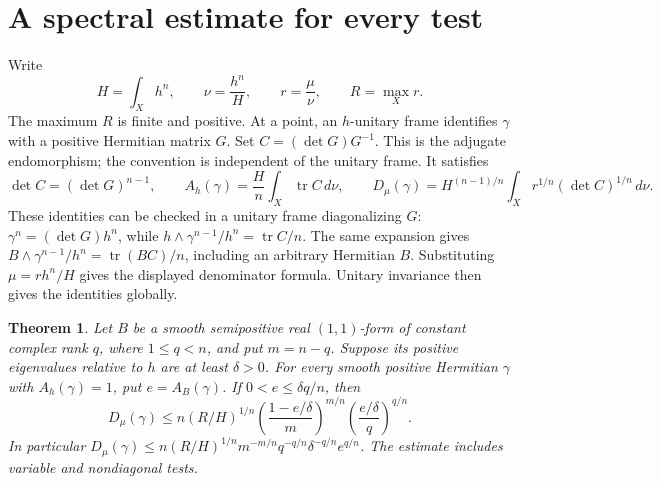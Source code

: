 \documentclass[11pt]{article}
\newtheorem{theorem}{Theorem}
\newcommand{\tr}{\operatorname{tr}}
\begin{document}
\section{A spectral estimate for every test}

Write
\[
 H=\int_Xh^n,\qquad \nu=\frac{h^n}{H},\qquad
 r=\frac{\mu}{\nu},\qquad R=\max_X r.
\]
The maximum \(R\) is finite and positive. At a point, an \(h\)-unitary
frame identifies \(\gamma\) with a positive Hermitian matrix \(G\).
Set \(C=(\det G)G^{-1}\). This is the adjugate endomorphism; the convention
is independent of the unitary frame. It satisfies
\[
 \det C=(\det G)^{n-1},\qquad
 A_h(\gamma)=\frac Hn\int_X\tr C\,d\nu,\qquad
 D_\mu(\gamma)=H^{(n-1)/n}
       \int_X r^{1/n}(\det C)^{1/n}\,d\nu .
\]
These identities can be checked in a unitary frame diagonalizing \(G\):
\(\gamma^n=(\det G)h^n\), while
\(h\wedge\gamma^{n-1}/h^n=\tr C/n\).
The same expansion gives
\(B\wedge\gamma^{n-1}/h^n=\tr(BC)/n\), including an arbitrary
Hermitian \(B\). Substituting \(\mu=rh^n/H\) gives the displayed
denominator formula. Unitary invariance then gives the identities globally.

\begin{theorem}\label{thm:gap}
Let \(B\) be a smooth semipositive real \((1,1)\)-form of constant
complex rank \(q\), where \(1\leq q<n\), and put \(m=n-q\).
Suppose its positive eigenvalues relative to \(h\) are at least
\(\delta>0\). For every smooth positive Hermitian \(\gamma\) with
\(A_h(\gamma)=1\), put \(e=A_B(\gamma)\).
If \(0<e\leq\delta q/n\), then
\begin{equation}\label{eq:gap}
 D_\mu(\gamma)\leq
 n(R/H)^{1/n}
 \left(\frac{1-e/\delta}{m}\right)^{m/n}
 \left(\frac{e/\delta}{q}\right)^{q/n}.
\end{equation}
In particular \(D_\mu(\gamma)\leq
n(R/H)^{1/n}m^{-m/n}q^{-q/n}\delta^{-q/n}e^{q/n}\).
The estimate includes variable and nondiagonal tests.
\end{theorem}
\end{document}
